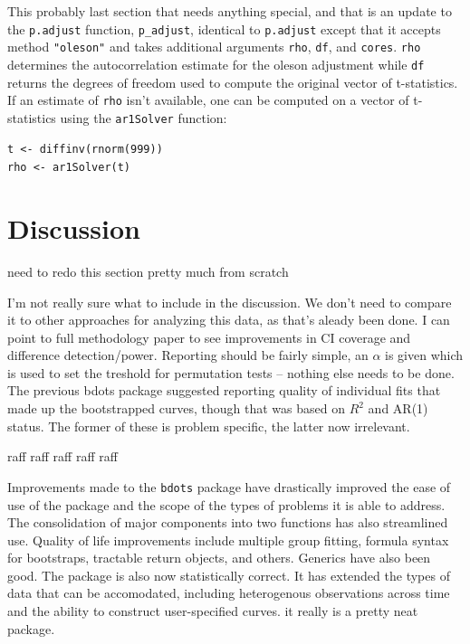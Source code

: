 \documentclass{article}
\begin{document}
This probably last section that needs anything special, and that is an update to the \texttt{p.adjust} function, \texttt{p\_adjust}, identical to \texttt{p.adjust} except that it accepts method \texttt{"oleson"} and takes additional arguments \texttt{rho}, \texttt{df}, and \texttt{cores}. \texttt{rho} determines the autocorrelation estimate for the oleson adjustment while \texttt{df} returns the degrees of freedom used to compute the original vector of t-statistics. If an estimate of \texttt{rho} isn't available, one can be computed on a vector of t-statistics using the \texttt{ar1Solver} function:

\begin{center}
\texttt{t <- diffinv(rnorm(999))} \\
\texttt{rho <- ar1Solver(t)}
\end{center}




\section{Discussion}

need to redo this section pretty much from scratch


I'm not really sure what to include in the discussion. We don't need to compare it to other approaches for analyzing this data, as that's aleady been done. I can point to full methodology paper to see improvements in CI coverage and difference detection/power. Reporting should be fairly simple, an $\alpha$ is given which is used to set the treshold for permutation tests -- nothing else needs to be done. The previous bdots package suggested reporting quality of individual fits that made up the bootstrapped curves, though that was based on $R^2$ and AR(1) status. The former of these is problem specific, the latter now irrelevant.

raff raff raff raff raff


Improvements made to the \texttt{bdots} package have drastically improved the ease of use of the package and the scope of the types of  problems it is able to address. The consolidation of major components into two functions has also streamlined use. Quality of life improvements include multiple group fitting, formula syntax for bootstraps, tractable return objects, and others. Generics have also been good. The package is also now statistically correct. It has extended the types of data that can be accomodated, including heterogenous observations across time and the ability to construct user-specified curves. it really is a pretty neat package.
\end{document}
